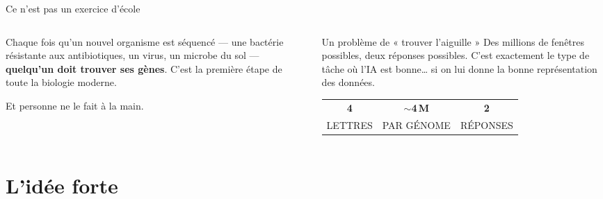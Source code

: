 \documentclass[11pt,aspectratio=169]{beamer}
\begin{document}
\begin{frame}{Ce n'est pas un exercice d'école}
  \begin{columns}[T,onlytextwidth]
    \begin{column}{0.55\textwidth}
      \small
      Chaque fois qu'un nouvel organisme est séquencé --- une bactérie résistante
      aux antibiotiques, un virus, un microbe du sol --- \textbf{quelqu'un doit
      trouver ses gènes}. C'est la première étape de toute la biologie moderne.
      \bigskip

      {\color{alivegray}\normalsize Et personne ne le fait à la main.}
    \end{column}
    \begin{column}{0.42\textwidth}
      \begin{navybox}{Un problème de « trouver l'aiguille »}
        \small Des millions de fenêtres possibles, deux réponses possibles.
        C'est exactement le type de tâche où l'IA est bonne\ldots{} si on lui
        donne la bonne représentation des données.
      \end{navybox}
      \vspace{0.4cm}
      \centering\small
      \begin{tabular}{ccc}
        {\Large\bfseries\color{aliveblue}4} &
        {\Large\bfseries\color{aliveblue}$\sim$4\,M} &
        {\Large\bfseries\color{aliveblue}2}\\[2pt]
        {\tiny\color{alivegray}LETTRES} &
        {\tiny\color{alivegray}PAR GÉNOME} &
        {\tiny\color{alivegray}RÉPONSES}
      \end{tabular}
    \end{column}
  \end{columns}
\end{frame}

\section{L'idée forte}
\end{document}

